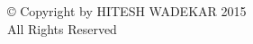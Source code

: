 
\thispagestyle{empty}

\vspace*{\fill}

\begin{center}
	© Copyright by HITESH WADEKAR 2015\\
	All Rights Reserved
\end{center}

\vspace*{\fill}